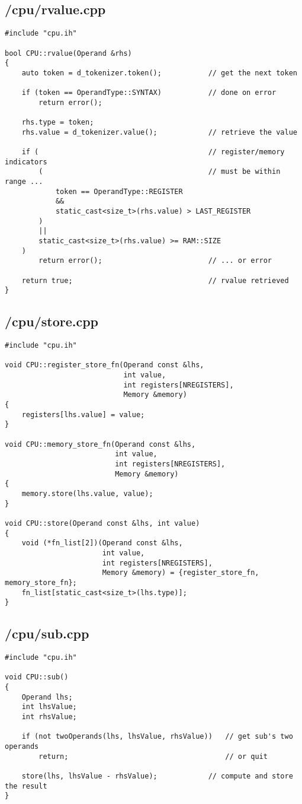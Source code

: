 \documentclass{article}
\begin{document}
\subsection*{/cpu/rvalue.cpp}
\begin{verbatim}
#include "cpu.ih"

bool CPU::rvalue(Operand &rhs)
{
    auto token = d_tokenizer.token();           // get the next token

    if (token == OperandType::SYNTAX)           // done on error
        return error();

    rhs.type = token;
    rhs.value = d_tokenizer.value();            // retrieve the value

    if (                                        // register/memory indicators
        (                                       // must be within range ...
            token == OperandType::REGISTER 
            && 
            static_cast<size_t>(rhs.value) > LAST_REGISTER
        )
        ||
        static_cast<size_t>(rhs.value) >= RAM::SIZE
    )
        return error();                         // ... or error

    return true;                                // rvalue retrieved
}
\end{verbatim}
\subsection*{/cpu/store.cpp}
\begin{verbatim}
#include "cpu.ih"

void CPU::register_store_fn(Operand const &lhs, 
                            int value, 
                            int registers[NREGISTERS], 
                            Memory &memory)
{
    registers[lhs.value] = value;
}

void CPU::memory_store_fn(Operand const &lhs, 
                          int value, 
                          int registers[NREGISTERS], 
                          Memory &memory)
{
    memory.store(lhs.value, value);
}

void CPU::store(Operand const &lhs, int value)
{
    void (*fn_list[2])(Operand const &lhs, 
                       int value, 
                       int registers[NREGISTERS], 
                       Memory &memory) = {register_store_fn, memory_store_fn};
    fn_list[static_cast<size_t>(lhs.type)];
}   
\end{verbatim}
\subsection*{/cpu/sub.cpp}
\begin{verbatim}
#include "cpu.ih"

void CPU::sub()
{
    Operand lhs;
    int lhsValue;
    int rhsValue;

    if (not twoOperands(lhs, lhsValue, rhsValue))   // get sub's two operands
        return;                                     // or quit

    store(lhs, lhsValue - rhsValue);            // compute and store the result
}
\end{verbatim}
\end{document}
